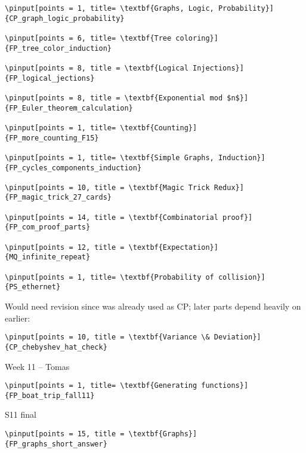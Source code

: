 \documentclass[quiz]{mcs}
\begin{document}

\begin{staffnotes}
\begin{verbatim}
\pinput[points = 1, title= \textbf{Graphs, Logic, Probability}]
{CP_graph_logic_probability}

\pinput[points = 6, title= \textbf{Tree coloring}]
{FP_tree_color_induction}

\pinput[points = 8, title = \textbf{Logical Injections}]
{FP_logical_jections}

\pinput[points = 8, title = \textbf{Exponential mod $n$}]
{FP_Euler_theorem_calculation}

\pinput[points = 1, title= \textbf{Counting}]
{FP_more_counting_F15}

\pinput[points = 1, title= \textbf{Simple Graphs, Induction}]
{FP_cycles_components_induction}

\pinput[points = 10, title = \textbf{Magic Trick Redux}]
{FP_magic_trick_27_cards}

\pinput[points = 14, title = \textbf{Combinatorial proof}]
{FP_com_proof_parts}

\pinput[points = 12, title = \textbf{Expectation}]
{MQ_infinite_repeat}

\pinput[points = 1, title= \textbf{Probability of collision}]
{PS_ethernet}
\end{verbatim}

Would need revision since was already used as CP;
later parts depend heavily on earlier:

\begin{verbatim}
\pinput[points = 10, title = \textbf{Variance \& Deviation}]
{CP_chebyshev_hat_check}
\end{verbatim}

\begin{center}
{\large Week 11 -- Tomas}
\end{center}

\begin{verbatim}
\pinput[points = 1, title= \textbf{Generating functions}]
{FP_boat_trip_fall11}

\end{verbatim}

S11 final

\begin{verbatim}
\pinput[points = 15, title = \textbf{Graphs}]
{FP_graphs_short_answer}


\end{verbatim}
\end{staffnotes}
\end{document}
